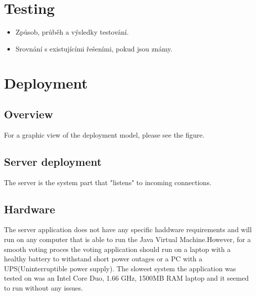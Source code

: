 \documentclass[11pt,twoside,a4paper]{book}
\begin{document}
\chapter{Testing}

\begin{itemize}
 \item Způsob, průběh a výsledky testování.
 \item Srovnání s existujícími řešeními, pokud jsou známy.
\end{itemize} 
 \chapter{Deployment}
\section{Overview}
For a graphic view of the deployment model, please see the figure. 
\section{Server deployment}
The server is the system part that "listens" to incoming connections.
\section{Hardware}
The server application does not have any specific haddware requirements and will run on any computer that is able to run the Java Virtual Machine.However, for a smooth voting proces the voting application should run on a laptop with a healthy battery to withstand short power outages or a PC with a UPS(Uninterruptible power supply). The slowest system the application was tested on was an Intel Core Duo, 1.66 GHz, 1500MB RAM laptop and it seemed to run without any issues. 
\end{document}
